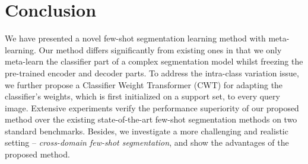 \documentclass[10pt,twocolumn,letterpaper]{article}
\begin{document}
\vspace{-0.2cm}

\section{Conclusion}
We have presented a novel few-shot segmentation learning method with meta-learning. Our method differs significantly from existing ones in that we only meta-learn the classifier part of a complex segmentation model whilst freezing the pre-trained encoder and decoder parts. 
To address the intra-class variation issue, we further propose a Classifier Weight Transformer (CWT) for adapting the classifier's weights, which is first initialized on a support set, to every query image.
Extensive experiments verify the performance superiority of 
our proposed method over the existing state-of-the-art few-shot segmentation methods on two standard benchmarks.
Besides, we investigate a more challenging and realistic setting -- \textit{cross-domain few-shot segmentation},
and show the advantages of the proposed method.






{\small


}
\end{document}
